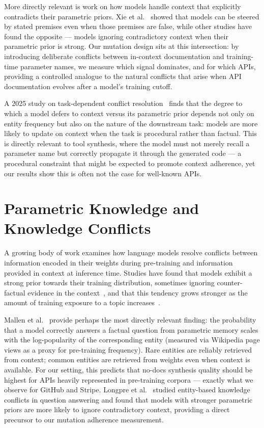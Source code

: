 \documentclass[12pt]{report}
\begin{document}
More directly relevant is work on how models handle context that explicitly
contradicts their parametric priors. Xie et al.~\cite{xie2023adaptive}
showed that models can be steered by stated premises even when those premises
are false, while other studies have found the opposite --- models ignoring
contradictory context when their parametric prior is strong. Our mutation
design sits at this intersection: by introducing deliberate conflicts between
in-context documentation and training-time parameter names, we measure which
signal dominates, and for which APIs, providing a controlled analogue to the
natural conflicts that arise when API documentation evolves after a model's
training cutoff.

A 2025 study on task-dependent conflict resolution~\cite{taskmatters2025}
finds that the degree to which a model defers to context versus its
parametric prior depends not only on entity frequency but also on the
nature of the downstream task: models are more likely to update on
context when the task is procedural rather than factual. This is
directly relevant to tool synthesis, where the model must not merely
recall a parameter name but correctly propagate it through the generated
code --- a procedural constraint that might be expected to promote
context adherence, yet our results show this is often not the case
for well-known APIs.

\section{Parametric Knowledge and Knowledge Conflicts}

A growing body of work examines how language models resolve conflicts between
information encoded in their weights during pre-training and information
provided in context at inference time. Studies have found that models exhibit
a strong prior towards their training distribution, sometimes ignoring
counter-factual evidence in the context~\cite{longpre2021entity},
and that this tendency grows stronger as the amount of training exposure to
a topic increases~\cite{mallen2023knowns}.

Mallen et al.~\cite{mallen2023knowns} provide perhaps the most directly
relevant finding: the probability that a model correctly answers a factual
question from parametric memory scales with the log-popularity of the
corresponding entity (measured via Wikipedia page views as a proxy for
pre-training frequency). Rare entities are reliably retrieved from context;
common entities are retrieved from weights even when context is available. For our setting, this predicts that no-docs synthesis
quality should be highest for APIs heavily represented in pre-training
corpora --- exactly what we observe for GitHub and Stripe.
Longpre et al.~\cite{longpre2021entity} studied entity-based knowledge
conflicts in question answering and found that models with stronger parametric
priors are more likely to ignore contradictory context, providing a direct
precursor to our mutation adherence measurement.
\end{document}
